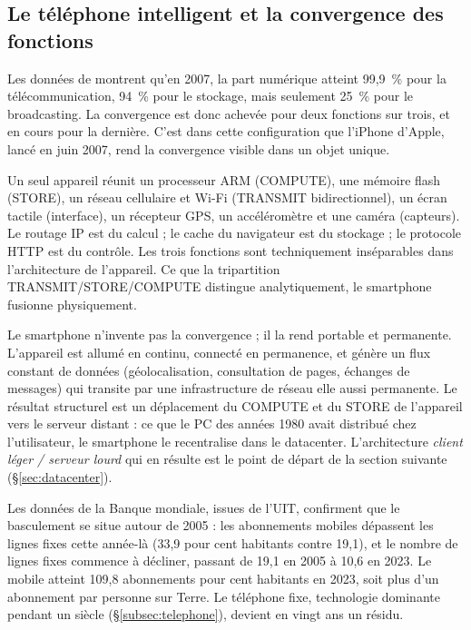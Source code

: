  
\subsection{Le téléphone intelligent et la convergence des fonctions}\label{subsec:smartphone}
 
Les données de \textcite{hilbert_worlds_2011} montrent qu'en 2007, la part numérique atteint 99,9~\% pour la télécommunication, 94~\% pour le stockage, mais seulement 25~\% pour le broadcasting. La convergence est donc achevée pour deux fonctions sur trois, et en cours pour la dernière. C'est dans cette configuration que l'iPhone d'Apple, lancé en juin 2007, rend la convergence visible dans un objet unique.
 
Un seul appareil réunit un processeur ARM (COMPUTE), une mémoire flash (STORE), un réseau cellulaire et Wi-Fi (TRANSMIT bidirectionnel), un écran tactile (interface), un récepteur GPS, un accéléromètre et une caméra (capteurs). Le routage IP est du calcul ; le cache du navigateur est du stockage ; le protocole HTTP est du contrôle. Les trois fonctions sont techniquement inséparables dans l'architecture de l'appareil. Ce que la tripartition TRANSMIT/STORE/COMPUTE distingue analytiquement, le smartphone fusionne physiquement.
 
Le smartphone n'invente pas la convergence ; il la rend portable et permanente. L'appareil est allumé en continu, connecté en permanence, et génère un flux constant de données (géolocalisation, consultation de pages, échanges de messages) qui transite par une infrastructure de réseau elle aussi permanente. Le résultat structurel est un déplacement du COMPUTE et du STORE de l'appareil vers le serveur distant : ce que le PC des années 1980 avait distribué chez l'utilisateur, le smartphone le recentralise dans le datacenter. L'architecture \emph{client léger / serveur lourd} qui en résulte est le point de départ de la section suivante (§\ref{sec:datacenter}).
 
Les données de la Banque mondiale, issues de l'UIT, confirment que le basculement se situe autour de 2005 : les abonnements mobiles dépassent les lignes fixes cette année-là (33,9 pour cent habitants contre 19,1), et le nombre de lignes fixes commence à décliner, passant de 19,1 en 2005 à 10,6 en 2023. Le mobile atteint 109,8 abonnements pour cent habitants en 2023, soit plus d'un abonnement par personne sur Terre. Le téléphone fixe, technologie dominante pendant un siècle (§\ref{subsec:telephone}), devient en vingt ans un résidu.
 
